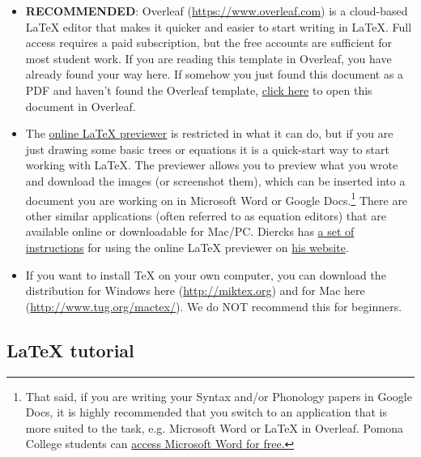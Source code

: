 \documentclass{article}
\begin{document}
\begin{itemize}

\item \textbf{RECOMMENDED}: Overleaf (\url{https://www.overleaf.com}) is a cloud-based \LaTeX{} editor that makes it quicker and easier to start writing in \LaTeX. Full access requires a paid subscription, but the free accounts  are  sufficient for most student work. If you are reading this template in Overleaf, you have already found your way here. If somehow you just found this document as a PDF and haven't found the Overleaf template, \href{https://www.overleaf.com/latex/templates/pomona-linguistics-quick-reference-guide/jthrqbrktmrd}{click here} to open this document in Overleaf. 

\item The \href{http://www.tlhiv.org/ltxpreview/}{online \LaTeX{} previewer} is restricted in what it can do, but if you are just drawing some basic trees or equations it is a quick-start way to start working with \LaTeX{}. The previewer allows you to preview what you wrote and download the images (or screenshot them), which can be inserted into a document you are working on in Microsoft Word or Google Docs.\footnote{That said, if you are writing your Syntax and/or Phonology papers in Google Docs, it is highly recommended that you switch to an application that is more suited to the task, e.g. Microsoft Word or \LaTeX{} in Overleaf. Pomona College students can \href{https://pomona.onthehub.com/WebStore/OfferingDetails.aspx?o=7479a671-aa7d-e511-9411-b8ca3a5db7a1}{access Microsoft Word for free.}} There are other similar applications (often referred to as equation editors) that are available online or downloadable for Mac/PC. Diercks has \href{http://pages.pomona.edu/~mjd14747/LateXpreviewer.pdf}{a set of instructions} for using the online \LaTeX{} previewer on \href{http://pages.pomona.edu/~mjd14747/tex.html}{his website}. 

\item If you want to install \TeX{} on your own computer, you can download the distribution for Windows here (\url{http://miktex.org}) and for Mac here (\url{http://www.tug.org/mactex/}). We do NOT recommend this for beginners. %

\end{itemize}

\subsection{\LaTeX{} tutorial}
\end{document}
